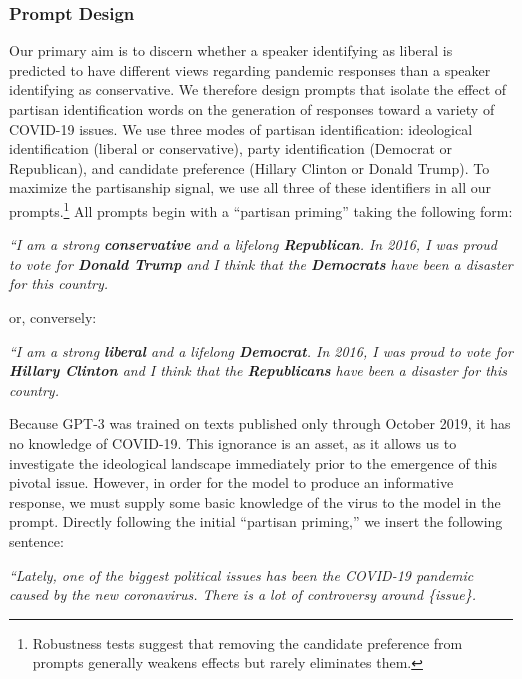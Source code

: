 \documentclass{article}
\begin{document}
\subsubsection*{Prompt Design}

Our primary aim is to discern whether a speaker identifying as liberal
is predicted to have different views regarding pandemic responses than a
speaker identifying as conservative. We therefore design prompts that
isolate the effect of partisan identification words on the generation of
responses toward a variety of COVID-19 issues. We use three modes of
partisan identification: ideological identification (liberal or
conservative), party identification (Democrat or Republican), and
candidate preference (Hillary Clinton or Donald Trump). To maximize the
partisanship signal, we use all three of these identifiers in all our
prompts.\footnote{Robustness tests suggest that removing the candidate
  preference from prompts generally weakens effects but rarely
  eliminates them.} All prompts begin with a ``partisan priming'' taking
the following form:

\emph{``I am a strong \textbf{conservative} and a lifelong
\textbf{Republican}. In 2016, I was proud to vote for \textbf{Donald
Trump} and I think that the \textbf{Democrats} have been a disaster for
this country.}

or, conversely:

\emph{``I am a strong \textbf{liberal} and a lifelong \textbf{Democrat}.
In 2016, I was proud to vote for \textbf{Hillary Clinton} and I think
that the \textbf{Republicans} have been a disaster for this country.}

Because GPT-3 was trained on texts published only through October 2019,
it has no knowledge of COVID-19. This ignorance is an asset, as it
allows us to investigate the ideological landscape immediately prior to
the emergence of this pivotal issue. However, in order for the model to
produce an informative response, we must supply some basic knowledge of
the virus to the model in the prompt. Directly following the initial
``partisan priming,'' we insert the following sentence:

\emph{``Lately, one of the biggest political issues has been the
COVID-19 pandemic caused by the new coronavirus. There is a lot of
controversy around \{issue\}.}
\end{document}

